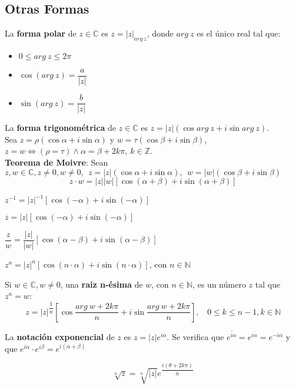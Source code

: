 \documentclass[11pt,a4paper]{article}
\begin{document}
\subsection{Otras Formas}
\noindent La \textbf{forma polar} de $z \in \mathbb{C}$ es $z = |z|_{arg\ z}$, donde $arg\ z$ es el \'unico real tal que:
\begin{multicols}{3}
\begin{itemize}
\item $0\leq arg\ z \leq 2\pi$
\item $\cos (arg\ z) = \dfrac{a}{|z|}$
\item $\sin (arg\ z) = \dfrac{b}{|z|}$
\end{itemize}
\end{multicols}

\noindent La \textbf{forma trigonom\'etrica} de $z \in \mathbb{C}$ es $z = |z| (\cos arg\ z + i \sin arg\ z)$.\\
\noindent Sea $z=\rho (\cos \alpha + i \sin \alpha)$ y $w = \tau (\cos \beta + i \sin \beta)$, $z=w \iff (\rho = \tau) \land \alpha = \beta + 2k\pi,\ k \in \mathbb{Z}$.\\

\noindent \textbf{Teorema de Moivre}: Sean $z,w \in \mathbb{C}, z\not=0, w\not=0,\ \ z=|z|(\cos \alpha + i \sin \alpha),\ \ w = |w| (\cos \beta + i \sin \beta)$
$$z \cdot w = |z||w|[\cos (\alpha + \beta) + i\sin(\alpha+\beta)]$$

\begin{itemize}
\begin{multicols}{2}
\item $z^{-1} = |z|^{-1}[\cos (-\alpha) + i \sin (-\alpha)]$
\item $\overline{z} = |z|[\cos (-\alpha) + i \sin (-\alpha)]$
\item $\dfrac{z}{w} = \dfrac{|z|}{|w|} [\cos (\alpha - \beta) + i \sin (\alpha - \beta)]$
\item $z^n = |z|^n [\cos (n\cdot\alpha) + i \sin (n\cdot\alpha)]$, con $n\in\mathbb{N}$
\end{multicols}
\end{itemize}

\noindent Si $w\in\mathbb{C}, w\not=0$, una \textbf{raiz n-\'esima} de $w$, con $n\in\mathbb{N}$, es un n\'umero $z$ tal que $z^n=w$:
$$z = |z|^{\dfrac{1}{n}} \left[\cos \dfrac{arg\ w + 2k\pi}{n} + i \sin \dfrac{arg\ w + 2k\pi}{n}\right], \ \ \ \ 0 \leq k \leq n-1, k \in \mathbb{N}$$

\noindent La \textbf{notaci\'on exponencial} de $z$ es $z=|z|e^{i\alpha}$. Se verifica que $\overline{e^{i\alpha}} = e^{\overline{i\alpha}} = e^{-i\alpha}$ y que $e^{i\alpha} \cdot e^{i\beta} = e^{i(\alpha+\beta)}$

$$\sqrt[n]{z} = \sqrt[n]{|z|} e^{\dfrac{i(\theta + 2k\pi)}{n}}$$
\end{document}

